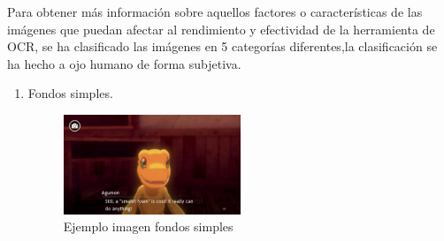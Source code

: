 Para obtener más información sobre aquellos factores o características de las imágenes que puedan afectar al rendimiento y efectividad de la herramienta de OCR, se ha clasificado las imágenes en 5 categorías diferentes,la clasificación se ha hecho a ojo humano de forma subjetiva.
\begin{enumerate}
	\item Fondos simples.
		\begin{figure}[H]
		\centering
		\includegraphics[width = 0.5\textwidth]{Imagenes/OCR/Simple.png}
		\caption{Ejemplo imagen fondos simples }
	\end{figure}
	

\end{enumerate}

